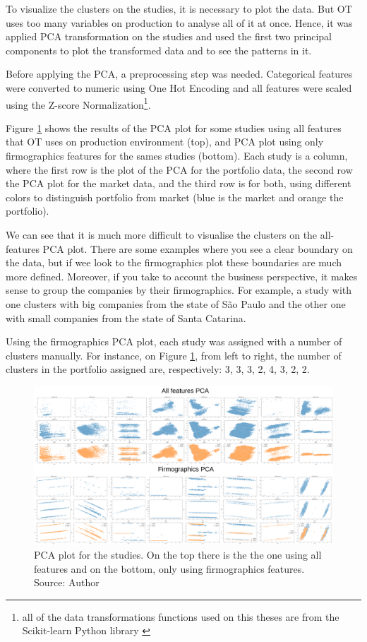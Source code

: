 To visualize the clusters on the studies, it is necessary to plot the data. But OT uses too many variables on production to analyse all of it at once. Hence, it was applied PCA transformation on the studies and used the first two principal components to plot the transformed data and to see the patterns in it. 

Before applying the PCA, a preprocessing step was needed. Categorical features were converted to numeric using One Hot Encoding and all features were scaled using the Z-score Normalization\footnote{all of the data transformations functions used on this theses are from the Scikit-learn Python library \cite{scikit-learn}}.

Figure \ref{fig:pca-plot} shows the results of the PCA plot for some studies using all features that OT uses on production environment (top), and PCA plot using only firmographics features for the sames studies (bottom). Each study is a column, where the first row is the plot of the PCA for the portfolio data, the second row the PCA plot for the market data, and the third row is for both, using different colors to distinguish portfolio from market (blue is the market and orange the portfolio).

We can see that it is much more difficult to visualise the clusters on the all-features PCA plot. There are some examples where you see a clear boundary on the data, but if wee look to the firmographics plot these boundaries are much more defined. Moreover, if you take to account the business perspective, it makes sense to group the companies by their firmographics. For example, a study with one clusters with big companies from the state of São Paulo and the other one with small companies from the state of Santa Catarina.

Using the firmographics PCA plot, each study was assigned with a number of clusters manually. For instance, on Figure \ref{fig:pca-plot}, from left to right, the number of clusters in the portfolio assigned are, respectively: 3, 3, 3, 2, 4, 3, 2, 2.  

\begin{figure}[h]
   \centering
   \includegraphics[width=\linewidth]{fig/ch3-pca-plot.png}
   \caption{PCA plot for the studies. On the top there is the the one using all features and on the bottom, only using firmographics features. Source: Author}
   \label{fig:pca-plot}
\end{figure}

